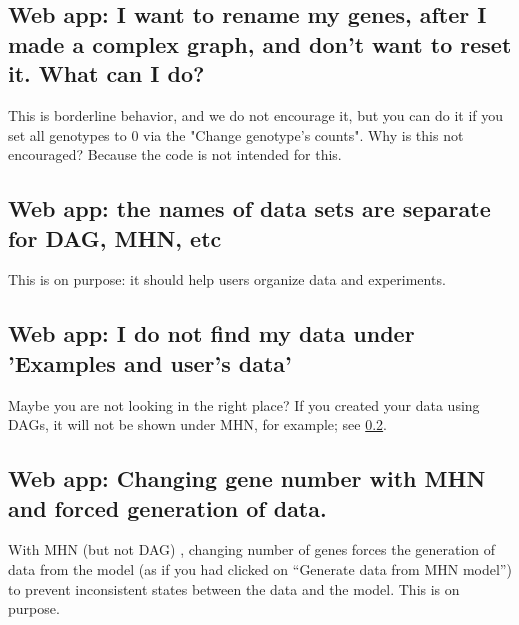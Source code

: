 \documentclass[a4paper,11pt]{article}
\begin{document}



\subsection{Web app: I want to rename my genes, after I made a complex graph, and don't want to reset it. What can I do?}

 This is borderline behavior, and we do not encourage it, but you can do it if you set all genotypes to 0 via the "Change genotype's counts". Why is this not encouraged? Because the code is not intended for this.



 \subsection{Web app: the names of data sets are separate for DAG, MHN, etc}\label{sec:names_separate}

 This is on purpose: it should help users organize data and experiments.


 \subsection{Web app: I do not find my data under 'Examples and user's data'}

 Maybe you are not looking in the right place? If you created your data using DAGs, it will not be shown under MHN, for example; see \ref{sec:names_separate}.


 \subsection{Web app: Changing gene number with MHN and forced generation of data.}
 
 With MHN (but not DAG) , changing number of genes forces the generation of data from the model (as if you had clicked on ``Generate data from MHN model'') to prevent inconsistent states between the data and the model. This is on purpose.
\end{document}
